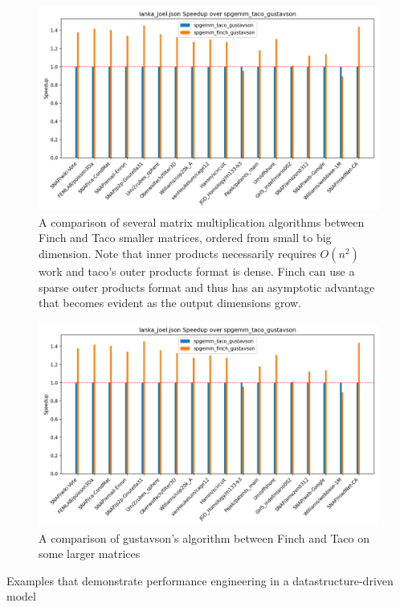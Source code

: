 \documentclass[acmsmall]{acmart}
\begin{document}
\begin{figure}
	\includegraphics[width=\linewidth]{spgemm_joel_speedup.png}
    \caption{A comparison of several matrix multiplication algorithms between Finch and Taco smaller matrices, ordered from small to big dimension. Note that inner products necessarily requires $O(n^2)$ work and taco's outer products format is dense. Finch can use a sparse outer products format and thus has an asymptotic advantage that becomes evident as the output dimensions grow.}
\end{figure}

\begin{figure}
	\includegraphics[width=\linewidth]{spgemm_joel_speedup.png}
    \caption{A comparison of gustavson's algorithm between Finch and Taco on some larger matrices}
\end{figure}

Examples that demonstrate performance engineering in a datastructure-driven model
\end{document}
